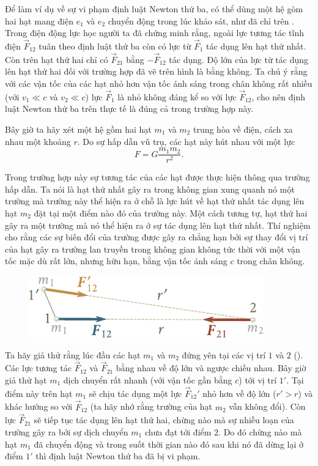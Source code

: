 Để làm ví dụ về sự vi phạm định luật Newton thứ ba, có thể dùng một hệ gòm hai hạt mang điện $e_1$ và $e_2$ chuyển động trong lúc khảo sát, như đã chỉ trên . Trong điện động lực học người ta đã chứng minh rằng, ngoài lực tương tác tĩnh điện $\vec{F}_{12}$ tuân theo định luật thứ ba còn có lực từ $\vec{F}_1$ tác dụng lên hạt thứ nhất. Còn trên hạt thứ hai chỉ có $\vec{F}_{21}$ bằng $-\vec{F}_{12}$ tác dụng. Độ lớn của lực từ tác dụng lên hạt thứ hai đối với trường hợp đã vẽ trên hình là bằng không. Ta chú ý rằng với các vận tốc của các hạt nhỏ hơn vận tốc ánh sáng trong chân không rất nhiều (với $v_1\ll c$ và $v_2\ll c$) lực $\vec{F}_1$ là nhỏ không đáng kể so với lực $\vec{F}_{12}$, cho nên định luật Newton thứ ba trên thực tế là đúng cả trong trường hợp này.

Bây giờ ta hãy xét một hệ gồm hai hạt $m_1$ và $m_2$ trung hòa về điện, cách xa nhau một khoảng  $r$. Do sự hấp dẫn vũ trụ, các hạt này hút nhau với một lực 
\vspace*{2pt}
\begin{equation}\label{eq:2_18}
F = G\frac{m_1 m_2}{r^2}.
\end{equation}

\noindent
Trong trường hợp này sự tương tác của các hạt được thực hiện thông qua trường hấp dẫn. Ta nói là hạt thứ nhất gây ra trong không gian xung quanh nó một trường mà trường này thể hiện ra ở chỗ là lực hút về hạt thứ nhất tác dụng lên hạt $m_2$ đặt tại một điểm nào đó của trường này. Một cách tương tự, hạt thứ hai gây ra một trường mà nó thể hiện ra ở sự tác dụng lên hạt thứ nhất. Thí nghiệm cho rằng các sự biến đổi của trường được gây ra chẳng hạn bởi sự thay đổi vị trí của hạt gây ra trường lan truyền trong không gian không tức thời với một vận tốc mặc dù rất lớn, nhưng hữu hạn, bằng vận tốc ánh sáng $c$ trong chân không.

\begin{figure}[!htb]
	\begin{center}
		\includegraphics[scale=1]{figures/ch_02/fig_2_2.pdf}
		\caption[]{}
		\label{fig:2_2}
	\end{center}
\end{figure}

Ta hãy giả thử rằng lúc đầu các hạt $m_1$ và $m_2$ đứng yên tại các vị trí $1$ và $2$ (). Các lực tương tác $\vec{F}_{12}$ và $\vec{F}_{21}$ bằng nhau về độ lớn và ngược chiều nhau. Bây giờ giả thử hạt $m_1$ dịch chuyển rất nhanh (với vận tốc gần bằng $c$) tới vị trí $1'$. Tại điểm này trên hạt $m_1$ sẽ chịu tác dụng một lực $\vec{F}_{12}'$ nhỏ hơn về độ lớn ($r'>r$) và khác hướng so với $\vec{F}_{12}$ (ta hãy nhớ rằng trường của hạt $m_2$ vẫn không đổi). Còn lực $\vec{F}_{21}$ sẽ tiếp tục tác dụng lên hạt thứ hai, chừng nào mà sự nhiễu loạn của trường gây ra bởi sự dịch chuyển $m_1$ chưa đạt tới điểm $2$. Do đó chừng nào mà hạt $m_1$ đã chuyển động và trong suốt thời gian nào đó sau khi nó đã dừng lại ở điểm $1'$ thì định luật Newton thứ ba đã bị vi phạm.


